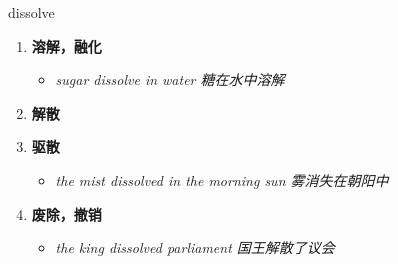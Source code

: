
\begin{frame}
{\huge dissolve}
\begin{center}
\begin{enumerate}\Large
  \item \textbf{溶解，融化}
  \begin{itemize}
    \item \em{\Large{sugar dissolve in water 糖在水中溶解}}
  \end{itemize}
  \item \textbf{解散}
  \item \textbf{驱散}
  \begin{itemize}
    \item \em{\Large{the mist dissolved in the morning sun 雾消失在朝阳中}}
  \end{itemize}
  \item \textbf{废除，撤销}
  \begin{itemize}
    \item \em{\Large{the king dissolved parliament 国王解散了议会}}
  \end{itemize}
\end{enumerate}
\end{center}
\end{frame}
